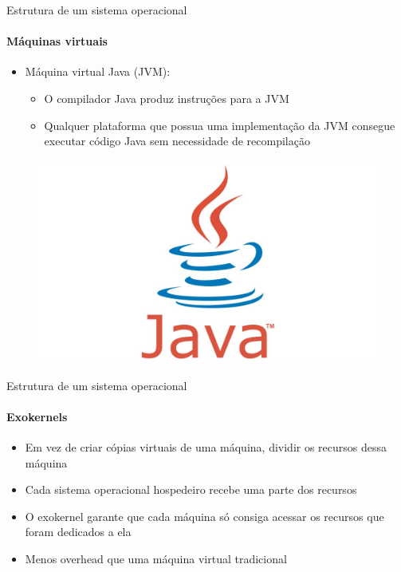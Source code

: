 \documentclass{beamer}
\begin{document}
\begin{frame}{Estrutura de um sistema operacional}
	\framesubtitle{Máquinas virtuais}
	\begin{itemize}
		\item Máquina virtual Java (JVM):
		\begin{itemize}
			\item O compilador Java produz instruções para a JVM
			\item Qualquer plataforma que possua uma implementação da JVM consegue executar código Java sem necessidade de recompilação
		\end{itemize}
	\end{itemize}
	\begin{figure}
		\includegraphics[width=0.5\paperwidth]{resources/java}
	\end{figure}
\end{frame}
\begin{frame}{Estrutura de um sistema operacional}
	\framesubtitle{Exokernels}
	\begin{itemize}
		\item Em vez de criar cópias virtuais de uma máquina, dividir os recursos dessa máquina
		\item Cada sistema operacional hospedeiro recebe uma parte dos recursos
		\item O exokernel garante que cada máquina só consiga acessar os recursos que foram dedicados a ela
		\item Menos overhead que uma máquina virtual tradicional
	\end{itemize}
\end{frame}
\end{document}
